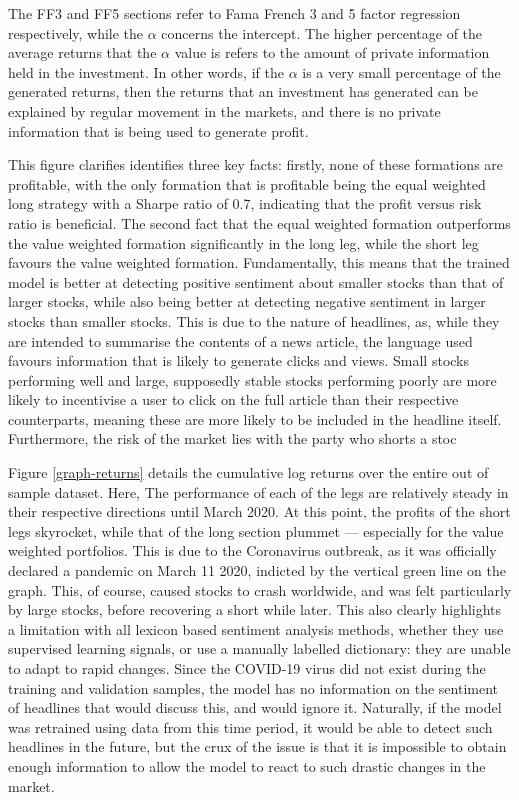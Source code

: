 The FF3 and FF5 sections refer to Fama French 3 and 5 factor regression respectively, while the $\alpha$ concerns the intercept. The higher percentage of the average returns that the $\alpha$ value is refers to the amount of private information held in the investment. In other words, if the $\alpha$ is a very small percentage of the generated returns, then the returns that an investment has generated can be explained by regular movement in the markets, and there is no private information that is being used to generate profit.

This figure clarifies identifies three key facts: firstly, none of these formations are profitable, with the only formation that is profitable being the equal weighted long strategy with a Sharpe ratio of 0.7, indicating that the profit versus risk ratio is beneficial. The second fact that the equal weighted formation outperforms the value weighted formation significantly in the long leg, while the short leg favours the value weighted formation. Fundamentally, this means that the trained model is better at detecting positive sentiment about smaller stocks than that of larger stocks, while also being better at detecting negative sentiment in larger stocks than smaller stocks. This is due to the nature of headlines, as, while they are intended to summarise the contents of a news article, the language used favours information that is likely to generate clicks and views. Small stocks performing well and large, supposedly stable stocks performing poorly are more likely to incentivise a user to click on the full article than their respective counterparts, meaning these are more likely to be included in the headline itself. Furthermore, the risk of the market lies with the party who shorts a stoc %

Figure \ref{graph-returns} details the cumulative log returns over the entire out of sample dataset. Here, The performance of each of the legs are relatively steady in their respective directions until March 2020. At this point, the profits of the short legs skyrocket, while that of the long section plummet --- especially for the value weighted portfolios. This is due to the Coronavirus outbreak, as it was officially declared a pandemic on March 11 2020, indicted by the vertical green line on the graph. This, of course, caused stocks to crash worldwide, and was felt particularly by large stocks, before recovering a short while later. This also clearly highlights a limitation with all lexicon based sentiment analysis methods, whether they use supervised learning signals, or use a manually labelled dictionary: they are unable to adapt to rapid changes. Since the COVID-19 virus did not exist during the training and validation samples, the model has no information on the sentiment of headlines that would discuss this, and would ignore it. Naturally, if the model was retrained using data from this time period, it would be able to detect such headlines in the future, but the crux of the issue is that it is impossible to obtain enough information to allow the model to react to such drastic changes in the market.


